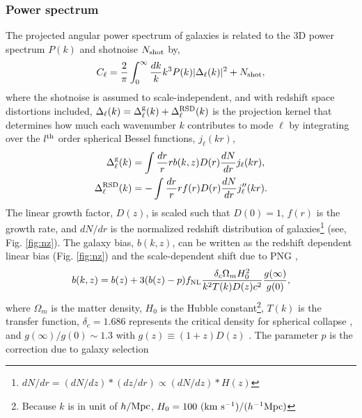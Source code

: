 \subsubsection{Power spectrum}
The projected angular power spectrum of galaxies is related to the 3D power spectrum $P(k)$  \citep[see, e.g.,][]{Padmanabhan2007} and shotnoise $N_{\rm shot}$ by,
\begin{equation}\label{eq:cell}
    C_{\ell} = \frac{2}{\pi}\int_{0}^{\infty}\frac{dk}{k}k^{3}P(k)|\Delta_{\ell}(k)|^{2} + N_{\rm shot},
\end{equation}
where the shotnoise is assumed to scale-independent, and with redshift space distortions included, $\Delta_{\ell}(k) = \Delta^{\rm g}_{\ell}(k) + \Delta^{\rm RSD}_{\ell}(k)$ is the projection kernel that determines how much each wavenumber $k$ contributes to mode $\ell$ by integrating over the $l^{\rm th}$ order spherical Bessel functions, $ j_{\ell}(kr)$,
\begin{align}
    \Delta^{\rm g}_{\ell}(k) &= \int \frac{dr}{r} r b(k, z) D(r) \frac{dN}{dr} j_{\ell}(kr),\\
    \Delta^{\rm RSD}_{\ell}(k) &= - \int \frac{dr}{r} r f(r) D(r) \frac{dN}{dr} j^{\prime\prime}_{\ell}(kr).
\end{align}
The linear growth factor, $D(z)$, is scaled such that $D(0)=1$, $f(r)$ is the growth rate, and $dN/dr$ is the normalized redshift distribution of galaxies\footnote{$dN/dr = (dN/dz)*(dz/dr) \propto (dN/dz)*H(z)$} (see, Fig. \ref{fig:nz}). The galaxy bias, $b(k,z)$, can be written as the redshift dependent linear bias (Fig. \ref{fig:nz}) and the scale-dependent shift due to PNG \citep{slosar2008constraints},
\begin{equation}
b(k, z) = b(z) + 3 (b(z) - p) f_{\rm NL} \frac{\delta_{c} \Omega_{m} H^{2}_{0}}{k^{2}T(k)D(z) c^{2}} \frac{g(\infty)}{g(0)},
\end{equation}
where $\Omega_{m}$ is the matter density, $H_{0}$ is the Hubble constant\footnote{Because $k$ is in unit of $h/{\rm Mpc}$, $H_{0}=100~({\rm km}~{\rm s}^{-1})/(h^{-1}{\rm Mpc})$}, $T(k)$ is the transfer function, $\delta_{c}=1.686$ represents the critical density for spherical collapse \citep{fillmore1984self}, and $g(\infty)/g(0) \sim 1.3$ with $g(z)\equiv (1+z) D(z)$ . The parameter $p$ is the correction due to galaxy selection
